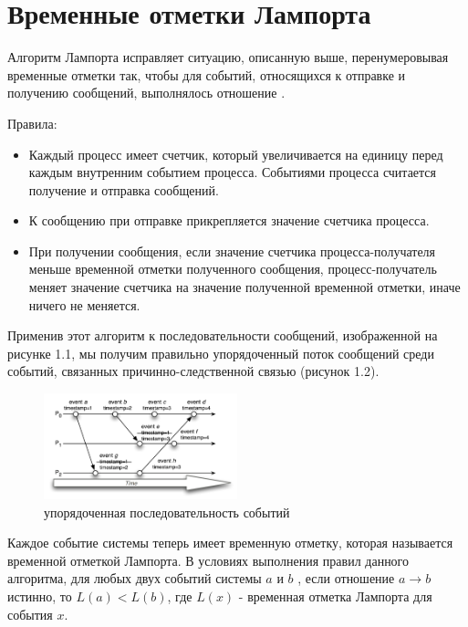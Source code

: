 \section{Временные отметки Лампорта}
Алгоритм Лампорта исправляет ситуацию, описанную выше, перенумеровывая временные отметки так, чтобы для событий, относящихся к отправке и получению сообщений, выполнялось отношение . \par
Правила:
\begin{itemize}
\item Каждый процесс имеет счетчик, который увеличивается на единицу  перед каждым внутренним событием процесса. Событиями процесса считается получение и отправка сообщений. 
\item К сообщению при отправке прикрепляется значение счетчика процесса.
\item При получении сообщения, если значение счетчика процесса-получателя меньше временной отметки полученного сообщения, процесс-получатель меняет значение счетчика на значение полученной временной отметки, иначе ничего не меняется. 
\end{itemize}
Применив этот алгоритм к последовательности сообщений, изображенной на рисунке 1.1, мы получим правильно упорядоченный поток сообщений среди событий, связанных 
причинно-следственной связью (рисунок 1.2). 
\begin{figure}
\centering
\includegraphics[width=0.5\textwidth]{img/lamport2.png}
\caption{упорядоченная последовательность событий}
\end{figure}
Каждое событие системы теперь имеет временную отметку, которая называется временной отметкой Лампорта. В условиях выполнения правил данного алгоритма, для любых двух событий системы $a$ и $b$ , если отношение $a \rightarrow b$ истинно, то $L(a) < L(b)$, где $L(x)$ - временная отметка Лампорта для события $x$. 

